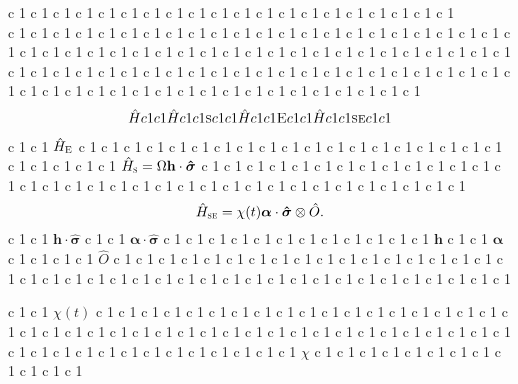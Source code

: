 \documentclass[11pt]{article}
\begin{document}
  c 1    c 1    c 1    c 1    c 1    c 1    c 1    c 1    c 1    c 1    c 1    c 1    c 1    c 1    c 1    c 1    c 1    c 1    c 1    c 1  \\   c 1    c 1    c 1    c 1    c 1    c 1    c 1    c 1    c 1    c 1    c 1    c 1    c 1    c 1    c 1    c 1    c 1    c 1    c 1    c 1    c 1    c 1    c 1    c 1    c 1    c 1    c 1    c 1    c 1    c 1    c 1    c 1    c 1    c 1    c 1    c 1    c 1    c 1    c 1    c 1    c 1    c 1    c 1    c 1    c 1    c 1    c 1    c 1    c 1    c 1    c 1    c 1    c 1    c 1    c 1    c 1    c 1    c 1    c 1    c 1    c 1    c 1    c 1    c 1    c 1    c 1    c 1    c 1    c 1    c 1    c 1    c 1    c 1    c 1    c 1    c 1    c 1    c 1    c 1    c 1    c 1    c 1    c 1    c 1    c 1    c 1 
\begin{align}
\hat{H}  c 1    c 1 \hat{H}  c 1    c 1 {\textsc{s}}  c 1    c 1 \hat{H}  c 1    c 1 {\textsc{E}}  c 1    c 1 \hat{H}  c 1    c 1 {\textsc{se}}  c 1    c 1 
\end{align}
  c 1    c 1 $\hat{H}_{\textsc{E}}$  c 1    c 1    c 1    c 1    c 1    c 1    c 1    c 1    c 1    c 1    c 1    c 1    c 1    c 1    c 1    c 1    c 1    c 1    c 1    c 1    c 1    c 1    c 1    c 1 $\hat{H}_{\textsc{s}}=\Omega \mathbf{h}\cdot \bm{\hat{\sigma}}$  c 1    c 1    c 1    c 1    c 1    c 1    c 1    c 1    c 1    c 1    c 1    c 1    c 1    c 1    c 1    c 1    c 1    c 1    c 1    c 1    c 1    c 1    c 1    c 1    c 1    c 1    c 1    c 1    c 1    c 1    c 1    c 1    c 1    c 1 
\begin{equation}
    \hat{H}_{\textsc{se}}= \chi(t) \bm{\alpha}\cdot \bm{\hat{\sigma}} \otimes \hat{{O}}.
\end{equation}
  c 1    c 1 $\mathbf{h}\cdot \bm{\hat{\sigma}}$  c 1    c 1 $\bm{\alpha}\cdot \bm{\hat{\sigma}}$  c 1    c 1    c 1    c 1    c 1    c 1    c 1    c 1    c 1    c 1    c 1    c 1 $\mathbf{h}$  c 1    c 1 $\bm{\alpha}$  c 1    c 1    c 1    c 1 $\hat{{O}}$  c 1    c 1    c 1    c 1    c 1    c 1    c 1    c 1    c 1    c 1    c 1    c 1    c 1    c 1    c 1    c 1    c 1    c 1    c 1    c 1    c 1    c 1    c 1    c 1    c 1    c 1    c 1    c 1    c 1    c 1    c 1    c 1    c 1    c 1    c 1    c 1    c 1    c 1    c 1    c 1 

  c 1    c 1 $\chi(t)$  c 1    c 1    c 1    c 1    c 1    c 1    c 1    c 1    c 1    c 1    c 1    c 1    c 1    c 1    c 1    c 1    c 1    c 1    c 1    c 1    c 1    c 1    c 1    c 1    c 1    c 1    c 1    c 1    c 1    c 1    c 1    c 1    c 1    c 1    c 1    c 1    c 1    c 1    c 1    c 1    c 1    c 1    c 1    c 1    c 1    c 1    c 1    c 1    c 1    c 1    c 1    c 1    c 1    c 1 $\chi$  c 1    c 1    c 1    c 1    c 1    c 1    c 1    c 1    c 1    c 1    c 1    c 1 
\end{document}
